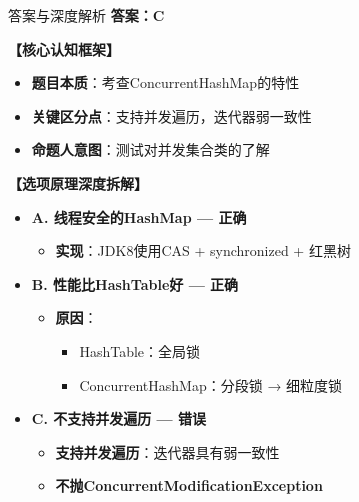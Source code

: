 \documentclass[12pt, a4paper]{ctexart}
\begin{document}
\begin{enumerate}[label=\textbf{\arabic*.}]
	      \begin{bluebox}{答案与深度解析}
		      \textbf{答案：C}

		      \textbf{【核心认知框架】}
		      \begin{itemize}[label={}, leftmargin=*, nosep]
			      \item \textbf{题目本质}：考查ConcurrentHashMap的特性
			      \item \textbf{关键区分点}：支持并发遍历，迭代器弱一致性
			      \item \textbf{命题人意图}：测试对并发集合类的了解
		      \end{itemize}

		      \textbf{【选项原理深度拆解】}
					  \begin{itemize}[label={}, leftmargin=*, nosep]

		      \item \textbf{A. 线程安全的HashMap — 正确}
		      \begin{itemize}[label={}, leftmargin=*, nosep]
			      \item \textbf{实现}：JDK8使用CAS + synchronized + 红黑树
		      \end{itemize}

		      \item \textbf{B. 性能比HashTable好 — 正确}
		      \begin{itemize}[label={}, leftmargin=*, nosep]
			      \item \textbf{原因}：
			            \begin{itemize}[label={}, nosep]
				            \item HashTable：全局锁
				            \item ConcurrentHashMap：分段锁 → 细粒度锁
			            \end{itemize}
		      \end{itemize}

		      \item \textbf{C. 不支持并发遍历 — 错误}
		      \begin{itemize}[label={}, leftmargin=*, nosep]
			      \item \textbf{支持并发遍历}：迭代器具有弱一致性
			      \item \textbf{不抛ConcurrentModificationException}
		      \end{itemize}


\end{itemize}
\end{bluebox}
\end{enumerate}
\end{document}
